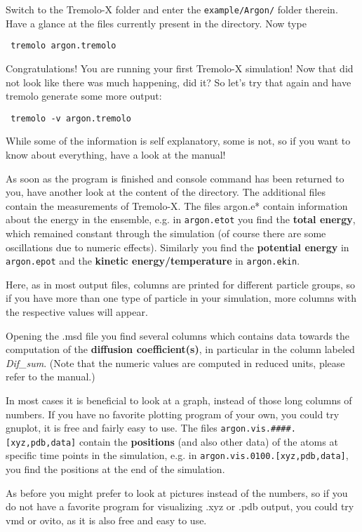 
Switch to the Tremolo-X folder and enter the \texttt{example/Argon/} folder therein.
Have a glance at the files currently present in the directory.
Now type
\begin{lstlisting}
 tremolo argon.tremolo
\end{lstlisting}
Congratulations! You are running your first Tremolo-X simulation!
\bigbreak
Now that did not look like there was much happening, did it? So let's try that again and have tremolo generate some more output:
\begin{lstlisting}
 tremolo -v argon.tremolo
\end{lstlisting}
While some of the information is self explanatory, some is not, so if you want to know about everything, have a look at the manual!

As soon as the program is finished and console command has been returned to you, have another look at the content of the directory. The additional files contain the measurements of Tremolo-X.
The files argon.e* contain information about the energy in the ensemble, e.g. in \texttt{argon.etot} you find the \textbf{total energy}, which remained constant through the simulation (of course there are some oscillations due to numeric effects). Similarly you find the \textbf{potential energy} in \texttt{argon.epot} and the \textbf{kinetic energy/temperature} in \texttt{argon.ekin}. 

Here, as in most output files, columns are printed for different particle groups, so if you have more than one type of particle in your simulation, more columns with the respective values will appear.

Opening the .msd file you find several columns which contains data towards the computation of the \textbf{diffusion coefficient(s)}, in particular in the column labeled \textit{Dif\_sum}. (Note that the numeric values are computed in reduced units, please refer to the manual.)

In most cases it is beneficial to look at a graph, instead of those long columns of numbers. If you have no favorite plotting program of your own, you could try gnuplot\footnotemark[1], it is free and fairly easy to use.
\bigbreak
The files \texttt{argon.vis.\#\#\#\#.[xyz,pdb,data]} contain the \textbf{positions} (and also other data) of the atoms at specific time points in the simulation, e.g. in \texttt{argon.vis.0100.[xyz,pdb,data]}, you find the positions at the end of the simulation. 

As before you might prefer to look at pictures instead of the numbers, so if you do not have a favorite program for visualizing .xyz or .pdb output, you could try vmd or ovito\footnotemark[1], as it is also free and easy to use. 

